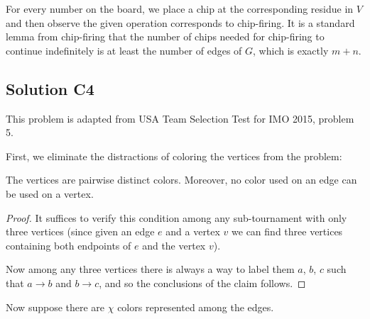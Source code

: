 \documentclass[11pt]{scrartcl}
\begin{document}
For every number on the board, we place a chip at the corresponding residue in $V$
and then observe the given operation corresponds to chip-firing.
It is a standard lemma from chip-firing that the number of chips
needed for chip-firing to continue indefinitely is at least the number of edges of $G$,
which is exactly $m+n$.

\subsection*{Solution C4}
This problem is adapted from USA Team Selection Test for IMO 2015, problem 5.

First, we eliminate the distractions of coloring the vertices from the problem:
\begin{claim*}
	The vertices are pairwise distinct colors.
	Moreover, no color used on an edge can be used on a vertex.
\end{claim*}
\begin{proof}
	It suffices to verify this condition
	among any sub-tournament with only three vertices
	(since given an edge $e$ and a vertex $v$ we can find three vertices
	containing both endpoints of $e$ and the vertex $v$).

	Now among any three vertices there is always a way to label them $a$, $b$, $c$
	such that $a \to b$ and $b \to c$,
	and so the conclusions of the claim follows.
\end{proof}

Now suppose there are $\chi$ colors represented among
the edges.
\end{document}
